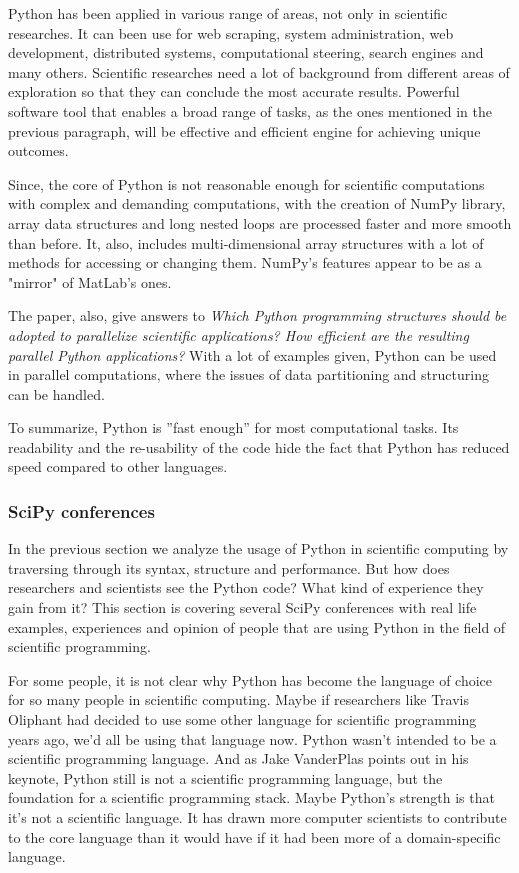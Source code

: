 Python has been applied in various range of areas, not only in scientific researches. It can been use for web scraping, system administration, web development, distributed systems, computational steering, search engines and many others. \cite{cai2005performance} Scientific researches need a lot of background from different areas of exploration so that they can conclude the most accurate results. Powerful software tool that enables a broad range of tasks, as the ones mentioned in the previous paragraph, will be effective and efficient engine for achieving unique outcomes. 

Since, the core of Python is not reasonable enough for scientific computations with complex and demanding computations, with the creation of NumPy library, array data structures and long nested loops are processed faster and more smooth than before. It, also, includes multi-dimensional array structures with a lot of methods for accessing or changing them. NumPy's features appear to be as a "mirror" of MatLab's ones. 

The paper, also, give answers to 
\textit{Which Python programming structures should be adopted to parallelize scientific applications? How efficient are the resulting parallel Python applications?} \cite{cai2005performance}
With a lot of examples given, Python can be used in parallel computations, where the issues of data partitioning and structuring can be handled. 

To summarize, Python is ”fast enough” for most computational tasks. Its readability and the re-usability of the code hide the fact that Python has reduced speed compared to other languages. 


\subsubsection*{SciPy conferences} 
\label{SciPy}

In the previous section we analyze the usage of Python in scientific computing by traversing through its syntax, structure and performance. But how does researchers and scientists see the Python code? What kind of experience they gain from it? This section is covering several SciPy conferences with real life examples, experiences and opinion of people that are using Python in the field of scientific programming.

For some people, it is not clear why Python has become the language of choice for so many people in scientific computing. Maybe if researchers like Travis Oliphant had decided to use some other language for scientific programming years ago, we’d all be using that language now. Python wasn’t intended to be a scientific programming language. And as Jake VanderPlas points out in his keynote, Python still is not a scientific programming language, but the foundation for a scientific programming stack. Maybe Python’s strength is that it’s not a scientific language. It has drawn more computer scientists to contribute to the core language than it would have if it had been more of a domain-specific language.

